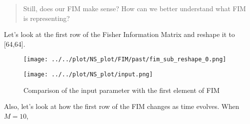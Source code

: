 \documentclass[
]{article}
\begin{document}
\begin{quote}
Still, does our FIM make sense? How can we better understand what FIM is
representing?
\end{quote}

Let's look at the first row of the Fisher Information Matrix and reshape
it to {[}64,64{]}.

\begin{figure}

\begin{minipage}{0.50\linewidth}

\texttt{[image: ../../plot/NS\_plot/FIM/past/fim\_sub\_reshape\_0.png]}

\end{minipage}%
%
\begin{minipage}{0.50\linewidth}

\texttt{[image: ../../plot/NS\_plot/input.png]}

\end{minipage}%

\caption{\label{fig-eig100}Comparison of the input parameter with the
first element of FIM}

\end{figure}%

Also, let's look at how the first row of the FIM changes as time
evolves. When \(M=10\),
\end{document}
